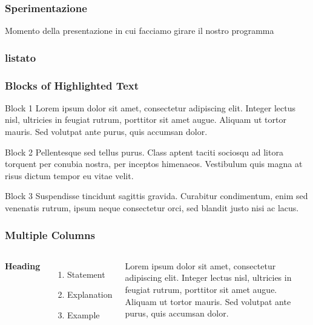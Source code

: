 \documentclass{beamer}
\begin{document}
\begin{frame}
\frametitle{Sperimentazione}
Momento della presentazione in cui facciamo girare il nostro programma
\end{frame}

\begin{frame}
\frametitle{listato}
\end{frame}


\begin{frame}
\frametitle{Blocks of Highlighted Text}
\begin{block}{Block 1}
Lorem ipsum dolor sit amet, consectetur adipiscing elit. Integer lectus nisl, ultricies in feugiat rutrum, porttitor sit amet augue. Aliquam ut tortor mauris. Sed volutpat ante purus, quis accumsan dolor.
\end{block}

\begin{block}{Block 2}
Pellentesque sed tellus purus. Class aptent taciti sociosqu ad litora torquent per conubia nostra, per inceptos himenaeos. Vestibulum quis magna at risus dictum tempor eu vitae velit.
\end{block}

\begin{block}{Block 3}
Suspendisse tincidunt sagittis gravida. Curabitur condimentum, enim sed venenatis rutrum, ipsum neque consectetur orci, sed blandit justo nisi ac lacus.
\end{block}
\end{frame}


\begin{frame}
\frametitle{Multiple Columns}
\begin{columns}[c] %

\textbf{Heading}
\begin{enumerate}
\item Statement
\item Explanation
\item Example
\end{enumerate}

Lorem ipsum dolor sit amet, consectetur adipiscing elit. Integer lectus nisl, ultricies in feugiat rutrum, porttitor sit amet augue. Aliquam ut tortor mauris. Sed volutpat ante purus, quis accumsan dolor.

\end{columns}
\end{frame}
\end{document}
